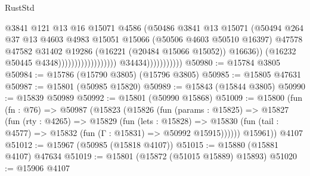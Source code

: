 \begin{lexlean}{RustStd}
\begin{coremodule}
                                                            @3841
                                                            @121
                                                            @13
                                                            @16
                                                            @15071
                                                            @4586
                                                            (@50486
                                                              @3841
                                                              @13
                                                              @15071
                                                              (@50494
                                                                @264
                                                                @37
                                                                @13
                                                                @4603
                                                                @4983
                                                                @15051
                                                                @15066
                                                                (@50506 @4603 @50510 @16397)
                                                                @47578
                                                                @47582
                                                                @31402
                                                                @19286
                                                                (@16221 (@20484 @15066 @15052))
                                                                @16636))
                                                            (@16232 @50445 @4348))))))))))))))))))
                          @34434)))))))))))
@50980 := @15784 @3805
@50984 := @15786 (@15790 @3805) (@15796 @3805)
@50985 := @15805 @47631
@50987 := @15801 (@50985 @15820)
@50989 := @15843 (@15844 @3805)
@50990 := @15839 @50989
@50992 := @15801 (@50990 @15868)
@51009 := @15800
    (fun (fn : @76) =>
    @50987
      (@15823
        (@15826
          (fun (params : @15825) =>
          @15827
            (fun (rty : @4265) =>
            @15829
              (fun (lets : @15828) =>
              @15830 (fun (tail : @4577) => @15832 (fun (Γ : @15831) => @50992 @15915))))))
        @15961))
    @4107
@51012 := @15967 (@50985 (@15818 @4107))
@51015 := @15880 (@15881 @4107) @47634
@51019 := @15801 (@15872 (@51015 @15889) @15893)
@51020 := @15906 @4107

\end{coremodule}
\end{lexlean}
